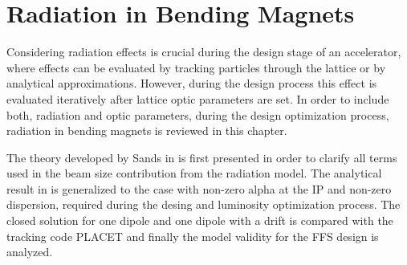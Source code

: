 \chapter{Radiation in Bending Magnets}\label{bendrad}
Considering radiation effects is crucial during the design stage of an accelerator, where effects can be evaluated by tracking particles through the lattice or by analytical approximations. However, during the design process this effect is evaluated iteratively after lattice optic parameters are set. In order to include both, radiation and optic parameters, during the design optimization process, radiation in bending magnets is reviewed in this chapter.\par
The theory developed by Sands in \cite{Sands} is first presented in order to clarify all terms used in the beam size contribution from the radiation model. The analytical result in \cite{Sands} is generalized to the case with non-zero alpha at the IP and non-zero dispersion, required during the desing and luminosity optimization process. The closed solution for one dipole and one dipole with a drift is compared with the tracking code PLACET \cite{Placet} and finally the model validity for the FFS design is analyzed.
